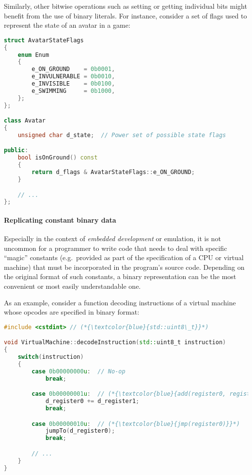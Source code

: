 \documentclass[twoside,10pt,letterpaper,usenames]{newstyle-PearsonGeneric-7-38}
\begin{document}
Similarly, other bitwise operations such as setting or getting
individual bits might benefit from the use of binary literals. For
instance, consider a set of flags used to represent the state of an
avatar in a game:

\begin{lstlisting}[language=C++]
struct AvatarStateFlags
{
    enum Enum
    {
        e_ON_GROUND    = 0b0001,
        e_INVULNERABLE = 0b0010,
        e_INVISIBLE    = 0b0100,
        e_SWIMMING     = 0b1000,
    };
};

class Avatar
{
    unsigned char d_state;  // Power set of possible state flags

public:
    bool isOnGround() const
    {
        return d_flags & AvatarStateFlags::e_ON_GROUND;
    }

    // ...
};
\end{lstlisting}
    

\paragraph[Replicating constant binary data]{Replicating constant binary data}\label{replicating-constant-binary-data}

Especially in the context of \emph{embedded development} or emulation,
it is not uncommon for a programmer to write code that needs to deal
with specific ``magic'' constants (e.g.~provided as part of the
specification of a CPU or virtual machine) that must be incorporated in
the program's source code. Depending on the original format of such
constants, a binary representation can be the most convenient or most
easily understandable one.

As an example, consider a function decoding instructions of a virtual
machine whose opcodes are specified in binary format:

\begin{lstlisting}[language=C++]
#include <cstdint> // (*{\textcolor{blue}{std::uint8\_t}}*)

void VirtualMachine::decodeInstruction(std::uint8_t instruction)
{
    switch(instruction)
    {
        case 0b00000000u:  // No-op
            break;

        case 0b00000001u:  // (*{\textcolor{blue}{add(register0, register1)}}*)
            d_register0 += d_register1;
            break;

        case 0b00000010u:  // (*{\textcolor{blue}{jmp(register0)}}*)
            jumpTo(d_register0);
            break;

        // ...
    }
}
\end{lstlisting}
    
\end{document}
